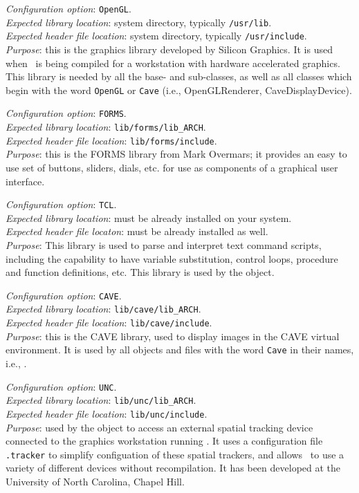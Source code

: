 \begin{itemize}
{\em Configuration option}: {\tt OpenGL}. \\
{\em Expected library location}: system directory, typically {\tt /usr/lib}. \\
{\em Expected header file location}: system directory, typically {\tt /usr/include}. \\
{\em Purpose}: this is the graphics library developed by Silicon Graphics.  
It is used when \VMD\ is being compiled for a workstation with hardware 
accelerated graphics.  This library is needed by all the  base- and sub-classes, as well as all classes which begin with the word {\tt OpenGL} or {\tt Cave} (i.e., OpenGLRenderer, CaveDisplayDevice).

{\em Configuration option}: {\tt FORMS}. \\
{\em Expected library location}: {\tt lib/forms/lib\_ARCH}. \\
{\em Expected header file location}: {\tt lib/forms/include}. \\
{\em Purpose}: this is the FORMS library from Mark Overmars; it provides an easy to use set of buttons, sliders, dials, etc. for use as components of a graphical user interface. 

{\em Configuration option}: {\tt TCL}. \\
{\em Expected library location}: must be already installed on your system. \\
{\em Expected header file locaton}: must be already installed as well. \\
{\em Purpose}: This library is used to parse and interpret text command scripts, including the capability to have variable substitution, control loops, procedure and function definitions, etc.  This library is used by the  object.

{\em Configuration option}: {\tt CAVE}. \\
{\em Expected library location}: {\tt lib/cave/lib\_ARCH}. \\
{\em Expected header file location}: {\tt lib/cave/include}. \\
{\em Purpose}: this is the CAVE library, used to display images in the CAVE virtual environment.  It is used by all objects and files with the word {\tt Cave} in their names, i.e., .

{\em Configuration option}: {\tt UNC}. \\
{\em Expected library location}: {\tt lib/unc/lib\_ARCH}. \\
{\em Expected header file location}: {\tt lib/unc/include}. \\
{\em Purpose}: used by the  object to access an external spatial tracking device connected to the graphics workstation running \VMD.  It uses a configuration file {\tt .tracker} to simplify configuation of these spatial trackers, and allows \VMD\ to use a variety of different devices without recompilation.  It has been developed at the University of North Carolina, Chapel Hill.

\end{itemize}

